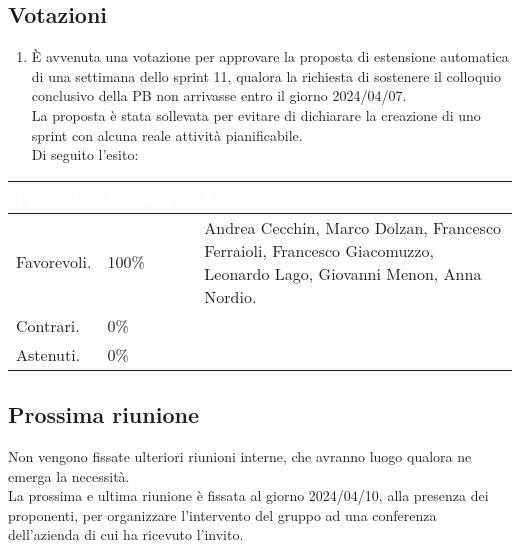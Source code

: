 \subsection{Votazioni} \label{subsec:resvotazione}
\begin{enumerate}
    \item È avvenuta una votazione per approvare la proposta di estensione automatica di una settimana dello sprint 11, qualora la richiesta di sostenere il colloquio conclusivo della PB non arrivasse entro il giorno 2024/04/07.\\
    La proposta è stata sollevata per evitare di dichiarare la creazione di uno sprint con alcuna reale attività pianificabile.\\
    Di seguito l'esito:
\end{enumerate}
\begingroup
    \setlength{\tabcolsep}{10pt}
    \renewcommand{\arraystretch}{1.5}
    \begin{tabularx}{\textwidth}{| l | l | X |}
         \hline
         \rowcolor{headerrow}\textbf{\textcolor{white}{Proposta}} & \textbf{\textcolor{white}{Sommario}} & \textbf{\textcolor{white}{Mittente}} \\
         \hline
         Favorevoli. & 100\%  & Andrea Cecchin, Marco Dolzan, Francesco Ferraioli, Francesco Giacomuzzo, Leonardo Lago, Giovanni Menon, Anna Nordio.\\
         \hline
         Contrari. & 0\% &  \\
         \hline
         Astenuti. & 0\% &  \\
         \hline
    \end{tabularx}
\endgroup

\subsection{Prossima riunione} \label{subsec:riunione}
Non vengono fissate ulteriori riunioni interne, che avranno luogo qualora ne emerga la necessità.\\
La prossima e ultima riunione è fissata al giorno 2024/04/10, alla presenza dei proponenti, per organizzare l'intervento del gruppo ad una conferenza dell'azienda di cui ha ricevuto l'invito.
